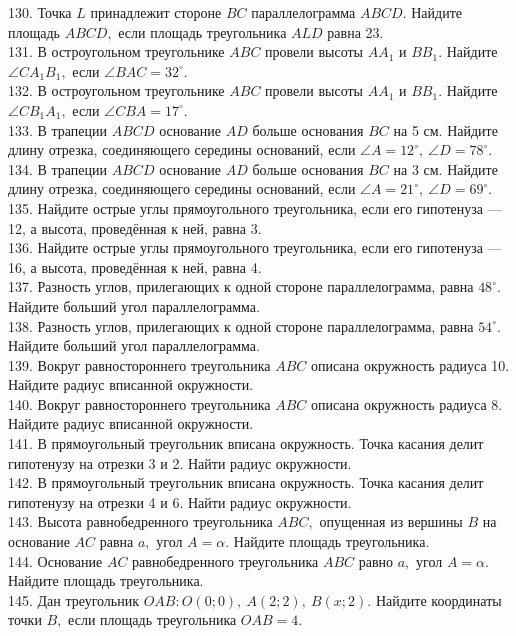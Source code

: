 \documentclass[12pt]{article}
\begin{document}
130. Точка $L$ принадлежит стороне $BC$ параллелограмма $ABCD.$ Найдите площадь $ABCD,$ если площадь треугольника $ALD$ равна 23.\\
131. В остроугольном треугольнике $ABC$ провели высоты $AA_1$ и $BB_1.$ Найдите $\angle CA_1B_1,$ если $\angle BAC=32^\circ.$\\
132. В остроугольном треугольнике $ABC$ провели высоты $AA_1$ и $BB_1.$ Найдите $\angle CB_1A_1,$ если $\angle CBA=17^\circ.$\\
133. В трапеции $ABCD$ основание $AD$ больше основания $BC$ на 5 см. Найдите длину отрезка, соединяющего середины оснований, если $\angle A=12^\circ,\ \angle D=78^\circ.$\\
134. В трапеции $ABCD$ основание $AD$ больше основания $BC$ на 3 см. Найдите длину отрезка, соединяющего середины оснований, если $\angle A=21^\circ,\ \angle D=69^\circ.$\\
135. Найдите острые углы прямоугольного треугольника, если его гипотенуза --- 12, а высота, проведённая к ней, равна 3.\\
136. Найдите острые углы прямоугольного треугольника, если его гипотенуза --- 16, а высота, проведённая к ней, равна 4.\\
137. Разность углов, прилегающих к одной стороне параллелограмма, равна $48^\circ.$ Найдите больший угол параллелограмма.\\
138. Разность углов, прилегающих к одной стороне параллелограмма, равна $54^\circ.$ Найдите больший угол параллелограмма.\\
139. Вокруг равностороннего треугольника $ABC$ описана окружность радиуса 10. Найдите радиус вписанной окружности.\\
140. Вокруг равностороннего треугольника $ABC$ описана окружность радиуса 8. Найдите радиус вписанной окружности.\\
141. В прямоугольный треугольник вписана окружность. Точка касания делит гипотенузу на отрезки 3 и 2. Найти радиус окружности.\\
142. В прямоугольный треугольник вписана окружность. Точка касания делит гипотенузу на отрезки 4 и 6. Найти радиус окружности.\\
143. Высота равнобедренного треугольника $ABC,$ опущенная из вершины $B$ на основание $AC$ равна $a,$ угол $A=\alpha.$ Найдите площадь треугольника.\\
144. Основание $AC$ равнобедренного треугольника $ABC$ равно $a,$ угол $A=\alpha.$ Найдите площадь треугольника.\\
145. Дан треугольник $OAB: O(0;0),\ A(2;2),\ B(x;2).$ Найдите координаты точки $B,$ если площадь треугольника $OAB=4.$\\
\end{document}
